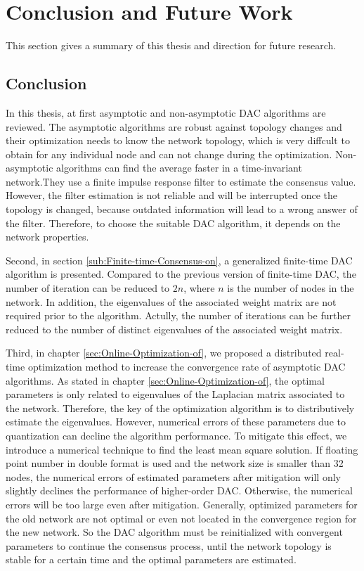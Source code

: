 
\chapter{\label{sec:Conclusion-and-Future}Conclusion and Future Work}

This section gives a summary of this thesis and direction for future
research.


\section{Conclusion}

In this thesis, at first asymptotic and non-asymptotic DAC algorithms
are reviewed. The asymptotic algorithms are robust against topology
changes and their optimization  needs to know the network topology,
which is very diffcult to obtain for any individual node and can not
change during the optimization. Non-asymptotic algorithms can find
the average faster in a time-invariant network.They use a finite impulse
response filter to estimate the consensus value. However, the filter
estimation is not reliable and will be interrupted once the topology
is changed, because outdated information will lead to a wrong answer
of the filter. Therefore, to choose the suitable DAC algorithm, it
depends on the network properties. 

 

Second, in section \ref{sub:Finite-time-Consensus-on}, a generalized
finite-time DAC algorithm is presented. Compared to the previous version
of finite-time DAC, the number of iteration can be reduced to $2n$,
where $n$ is the number of nodes in the network. In addition, the
 eigenvalues of the associated weight matrix are not required prior
to the algorithm. Actully, the number of iterations can be further
reduced to the number of distinct eigenvalues of the associated weight
matrix. 



Third, in chapter \ref{sec:Online-Optimization-of}, we proposed a
distributed real-time optimization method to increase the convergence
rate of asymptotic DAC algorithms. As stated in chapter \ref{sec:Online-Optimization-of},
the optimal parameters is only related to eigenvalues of the Laplacian
matrix associated to the network. Therefore, the key of the optimization
algorithm is to distributively estimate the eigenvalues.  However,
numerical errors of these parameters due to quantization can decline
the algorithm performance. To mitigate this effect, we introduce a
numerical technique to find the least mean square solution. If floating
point number in double format is used and the network size is smaller
than 32 nodes, the numerical errors of estimated parameters after
mitigation will only slightly declines the performance of higher-order
DAC.  Otherwise, the numerical errors will be too large even after
mitigation.  Generally, optimized parameters for the old network are not
optimal or even not located in the convergence region for the new
network. So the DAC algorithm must be reinitialized with convergent
parameters to continue the consensus process, until the network topology
is stable for a certain time and the optimal parameters are estimated. 

